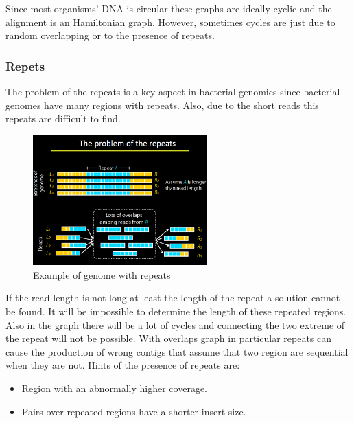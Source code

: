     Since most organisms' DNA is circular these graphs are ideally cyclic and the alignment is an Hamiltonian graph.
    However, sometimes cycles are just due to random overlapping or to the presence of repeats.

        \subsubsection{Repets}
        The problem of the repeats is a key aspect in bacterial genomics since bacterial genomes have many regions with repeats.
        Also, due to the short reads this repeats are difficult to find.

        \begin{figure}[H]
        \centering
        \includegraphics[width=0.6\textwidth]{Repeats.png}
        \caption{Example of genome with repeats}
        \end{figure}

        If the read length is not long at least the length of the repeat a solution cannot be found.
        It will be impossible to determine the length of these repeated regions.
        Also in the graph there will be a lot of cycles and connecting the two extreme of the repeat will not be possible.
        With overlaps graph in particular repeats can cause the production of wrong contigs that assume that two region are sequential when they are not.
        Hints of the presence of repeats are:

        \begin{multicols}{2}
            \begin{itemize}
                \item Region with an abnormally higher coverage.
                \item Pairs over repeated regions have a shorter insert size.
            \end{itemize}
        \end{multicols}

